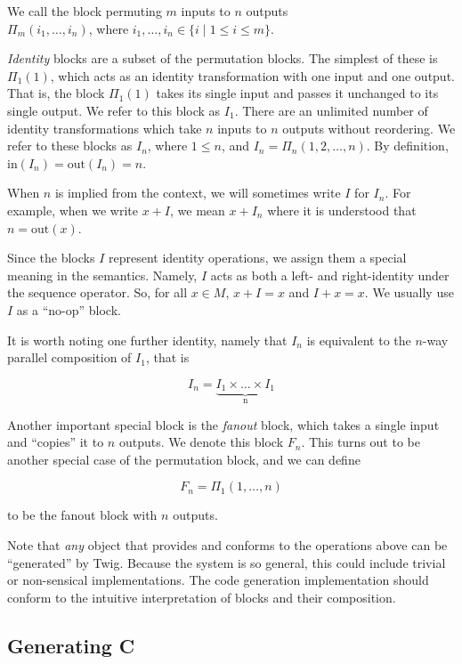 We call the block permuting $m$ inputs to $n$ outputs\\
$\Pi_m(i_1,\ldots,i_n)$, where $i_1,\ldots,i_n \in \lbrace i \;|\;
1 \leq i \leq m \rbrace$.

\emph{Identity} blocks are a subset of the permutation blocks. The
simplest of these is $\Pi_1(1)$, which acts as an identity
transformation with one input and one output. That is, the block
$\Pi_1(1)$ takes its single input and passes it unchanged to its
single output. We refer to this block as $I_1$. There are an
unlimited number of identity transformations which take $n$ inputs
to $n$ outputs without reordering. We refer to these blocks as
$I_n$, where $1 \leq n$, and $I_n = \Pi_n(1,2,\ldots,n)$. By
definition, $\mbox{in}(I_n) = \mbox{out}(I_n) = n$.

When $n$ is implied from the context, we will sometimes write $I$
for $I_n$. For example, when we write $x+I$, we mean $x+I_n$ where
it is understood that $n = \mbox{out}(x)$.

Since the blocks $I$ represent identity operations, we assign them
a special meaning in the semantics. Namely, $I$ acts as both a
left- and right-identity under the sequence operator. So, for all
$x \in M$, $x + I = x$ and $I + x = x$. We usually use $I$ as a
``no-op'' block.

It is worth noting one further identity, namely that $I_n$ is
equivalent to the $n$-way parallel composition of $I_1$, that is

\[
I_n = \underbrace{I_1 \times \ldots \times I_1}_\text{n}
\]

Another important special block is the \emph{fanout} block, which
takes a single input and ``copies'' it to $n$ outputs. We denote
this block $F_n$. This turns out to be another special case of the
permutation block, and we can define

\[
F_n = \Pi_1(1,\ldots,n)
\]

to be the fanout block with $n$ outputs.

Note that \emph{any} object that provides and conforms to the
operations above can be ``generated'' by Twig. Because the system
is so general, this could include trivial or non-sensical
implementations. The code generation implementation should conform
to the intuitive interpretation of blocks and their composition.


\subsection{Generating C}
\label{sec:code-gen:c}

